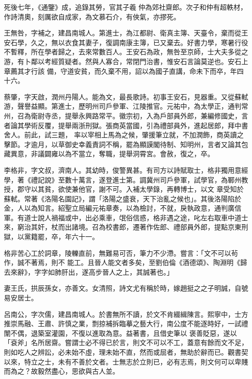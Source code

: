 \begin{pinyinscope}
 死後七年，《通鑒》成，追錄其勞，官其子羲
 仲為郊社齋郎。次子和仲有超軼材，作詩清奧，刻厲欲自成家，為文慕石介，有俠氣，亦摎死。



 王無咎，字補之，建昌南城人。第進士，為江都尉、衛真主簿、天臺令，棄而從王安石學，久之，無以衣食其妻子，復調南康主簿，已又棄去。好書力學，寒暑行役不暫釋，所在學者歸之，去來常數百人。王安石為政，無咎至京師，士大夫多從之游，有卜鄰以考經質疑者。然與人寡合，常閉門治書，惟安石言論莫逆也。安石上章薦其才行該
 備，守道安貧，而久棄不用，詔以為國子直講，命未下而卒，年四十六。



 蔡肇，字天啟，潤州丹陽人。能為文，最長歌詩。初事王安石，見器重。又從蘇軾游，聲譽益顯。第進士，歷明州司戶參軍、江陵推官。元祐中，為太學正，通判常州，召為衛尉寺丞，提舉永興路常平。徽宗初，入為戶部員外郎，兼編修國史，言者論其學術反覆，提舉兩浙刑獄。張商英當國，引為禮部員外，進起居郎，拜中書舍人。前此，試三題，
 率以宰相上馬為之候，肇援筆立就，不加潤飾，商英讀之擊節。才逾月，以草御史幸義責詞不稱，罷為顯謨閣待制、知明州，言者又論其包藏異意，非議闢雍以為不當立，奪職，提舉洞霄宮。會赦，復之，卒。



 李格非，字文叔，濟南人。其幼時，俊警異甚。有司方以詩賦取士，格非獨用意經學，著《禮記說》至數十萬言，遂登進士第。調冀州司戶參軍，試學官，為鄆州教授，郡守以其貧，欲使兼他官，謝不可。入補太學錄，再轉博士，以文
 章受知於蘇軾。常著《洛陽名園記》，謂「洛陽之盛衰，天下治亂之候也」。其後洛陽陷於金，人以為知言。紹聖立局編元祐章奏，以為檢討，不就，戾執政意，通判廣信軍。有道士說人禍福或中，出必乘車，氓俗信惑，格非遇之途，叱左右取車中道士來，窮治其奸，杖而出諸境。召為校書郎，遷著作佐郎、禮部員外郎，提點京東刑獄，以黨籍罷，卒，年六十一。



 格非苦心工於詞章，陵轢直前，無難易可否，筆力不少滯。嘗言：「文不可以茍作，誠不著焉，則不
 能工。且晉人能文者多矣，至劉伯倫《酒德頌》、陶淵明《歸去來辭》，字字如肺肝出，遂高步晉人之上，其誠著也。」



 妻王氏，拱辰孫女，亦善文。女清照，詩文尤有稱於時，嫁趙挺之之子明誠，自號易安居士。



 呂南公，字次儒，建昌南城人。於書無所不讀，於文不肯綴緝陳言。熙寧中，士方推崇馬融、王肅、許慎之業，剽掠補拆臨摹之藝大行，南公度不能逐時好，一試禮闈不偶，退築室灌園，不復以進取為意。益著書，且借史筆以
 褒善貶惡，遂以「袞斧」名所居齋。嘗謂士必不得已於言，則文不可以不工，蓋意有餘而文不足，則如吃人之辨訟，必未始不虛，理未始不直，然而或屈者，無助於辭而已。觀書契以來，特立之士，未有不善於文者。士無志於立則已，必有志焉，則文何可以卑賤而為之？故毅然盡心，思欲與古人並。




\end{pinyinscope}

